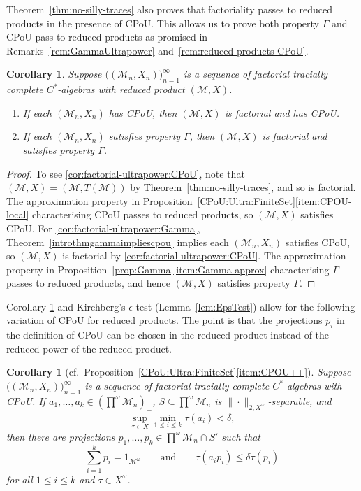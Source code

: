 \documentclass[a4paper,11pt]{amsart}
\newtheorem{corollary}[theorem]{Corollary}
\theoremstyle{definition}
\numberwithin{equation}{section}
\numberwithin{theorem}{section}
\newcommand{\M}{\mathcal{M}}
\begin{document}
Theorem~\ref{thm:no-silly-traces} also proves that factoriality passes to reduced products in the presence of CPoU.  This allows us to prove both property $\Gamma$ and CPoU pass to reduced products as promised in Remarks~\ref{rem:GammaUltrapower} and~\ref{rem:reduced-products-CPoU}.

\begin{corollary}\label{cor:factorial-ultrapower}
	Suppose $\big((\M_n, X_n)\big)_{n=1}^\infty$ is a sequence of factorial tracially complete $C^*$-algebras with reduced product $(\M, X)$.
	\begin{enumerate}
		\item\label{cor:factorial-ultrapower:CPoU} If each $(\M_n, X_n)$ has CPoU, then $(\M, X)$ is factorial and has CPoU.
		\item\label{cor:factorial-ultrapower:Gamma} If each $(\M_n, X_n)$ satisfies property $\Gamma$, then $(\M, X)$ is factorial and satisfies property $\Gamma$.
	\end{enumerate}
\end{corollary}

\begin{proof}
	To see \ref{cor:factorial-ultrapower:CPoU}, note that $(\M, X)=(\M,T(\M))$ by Theorem~\ref{thm:no-silly-traces}, and so is factorial.  The approximation property in Proposition~\ref{CPoU:Ultra:FiniteSet}\ref{item:CPOU-local} characterising CPoU passes to reduced products, so $(\M, X)$ satisfies CPoU.  For \ref{cor:factorial-ultrapower:Gamma}, Theorem~\ref{introthmgammaimpliescpou} implies each $(\M_n, X_n)$ satisfies CPoU, so $(\M, X)$ is factorial by \ref{cor:factorial-ultrapower:CPoU}.  The approximation property in Proposition~\ref{prop:Gamma}\ref{item:Gamma-approx} characterising $\Gamma$ passes to reduced products, and hence $(\M, X)$ satisfies property $\Gamma$.
\end{proof}

Corollary \ref{cor:factorial-ultrapower} and Kirchberg's $\epsilon$-test (Lemma~\ref{lem:EpsTest}) allow for the following variation of CPoU for reduced products.  The point is that the projections $p_i$ in the definition of CPoU can be chosen in the reduced product instead of the reduced power of the reduced product.

\begin{corollary}[cf.\ Proposition~\ref{CPoU:Ultra:FiniteSet}\ref{item:CPOU++}]
\label{cor:CPoU-in-ultrapower}
	Suppose $\big((\M_n, X_n)\big)_{n=1}^\infty$ is a sequence of factorial tracially complete $C^*$-algebras with CPoU.  If $a_1, \ldots, a_k \in (\prod^\omega \M_n)_+$, $S \subseteq \prod^\omega \M_n$ is $\|\cdot\|_{2, X^\omega}$-separable, and
	\begin{equation}
		\sup_{\tau \in X} \min_{1 \leq i \leq k} \tau(a_i) < \delta,
	\end{equation}
	then there are projections $p_1, \ldots, p_k \in \prod^\omega \M_n \cap S'$ such that
	\begin{equation}
		\sum_{i=1}^k p_i = 1_{\M^\omega} \qquad \text{and} \qquad \tau(a_i p_i) \leq \delta \tau(p_i)
	\end{equation}
	for all $1 \leq i \leq k$ and $\tau \in X^\omega$.
\end{corollary}
\end{document}

